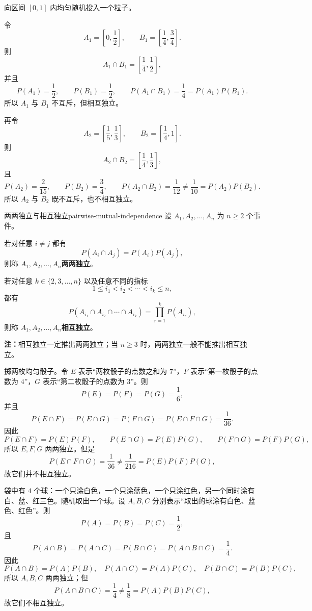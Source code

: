 \begin{example}[独立与互斥的区别]
向区间 $[0,1]$ 内均匀随机投入一个粒子。

令
\[
A_1=\left[0,\frac12\right],
\qquad
B_1=\left[\frac14,\frac34\right].
\]
则
\[
A_1\cap B_1=\left[\frac14,\frac12\right],
\]
并且
\[
P(A_1)=\frac12,
\qquad
P(B_1)=\frac12,
\qquad
P(A_1\cap B_1)=\frac14=P(A_1)P(B_1).
\]
所以 $A_1$ 与 $B_1$ 不互斥，但相互独立。

再令
\[
A_2=\left[\frac15,\frac13\right],
\qquad
B_2=\left[\frac14,1\right].
\]
则
\[
A_2\cap B_2=\left[\frac14,\frac13\right],
\]
且
\[
P(A_2)=\frac{2}{15},
\qquad
P(B_2)=\frac34,
\qquad
P(A_2\cap B_2)=\frac1{12}\ne\frac1{10}=P(A_2)P(B_2).
\]
所以 $A_2$ 与 $B_2$ 既不互斥，也不相互独立。
\end{example}
\begin{mydefinition}{两两独立与相互独立}{pairwise-mutual-independence}
	设 $A_1,A_2,\ldots,A_n$ 为 $n\geq2$ 个事件。
	
	若对任意 $i\ne j$ 都有
	\[
	P(A_i\cap A_j)=P(A_i)P(A_j),
	\]
	则称 $A_1,A_2,\ldots,A_n$\textbf{两两独立}。
	
	若对任意 $k\in\{2,3,\ldots,n\}$ 以及任意不同的指标
	\[
	1\leq i_1<i_2<\cdots<i_k\leq n,
	\]
	都有
	\[
	P(A_{i_1}\cap A_{i_2}\cap\cdots\cap A_{i_k})
	=\prod_{r=1}^{k}P(A_{i_r}),
	\]
	则称 $A_1,A_2,\ldots,A_n$\textbf{相互独立}。
\end{mydefinition}

\textbf{注：}\quad 相互独立一定推出两两独立；当 $n\geq3$ 时，两两独立一般不能推出相互独立。
\begin{example}[两两独立不推出相互独立]
掷两枚均匀骰子。令 $E$ 表示“两枚骰子的点数之和为 $7$”，$F$ 表示“第一枚骰子的点数为 $4$”，$G$ 表示“第二枚骰子的点数为 $3$”。则
\[
P(E)=P(F)=P(G)=\frac16,
\]
并且
\[
P(E\cap F)=P(E\cap G)=P(F\cap G)=P(E\cap F\cap G)=\frac1{36}.
\]
因此
\[
P(E\cap F)=P(E)P(F),
\qquad
P(E\cap G)=P(E)P(G),
\qquad
P(F\cap G)=P(F)P(G),
\]
所以 $E,F,G$ 两两独立。但是
\[
P(E\cap F\cap G)=\frac1{36}
\ne\frac1{216}=P(E)P(F)P(G),
\]
故它们并不相互独立。
\end{example}

\begin{example}[三色球模型]
袋中有 $4$ 个球：一个只涂白色，一个只涂蓝色，一个只涂红色，另一个同时涂有白、蓝、红三色。随机取出一个球。设 $A,B,C$ 分别表示“取出的球涂有白色、蓝色、红色”。则
\[
P(A)=P(B)=P(C)=\frac12,
\]
且
\[
P(A\cap B)=P(A\cap C)=P(B\cap C)=P(A\cap B\cap C)=\frac14.
\]
因此
\[
P(A\cap B)=P(A)P(B),
\quad
P(A\cap C)=P(A)P(C),
\quad
P(B\cap C)=P(B)P(C),
\]
所以 $A,B,C$ 两两独立；但
\[
P(A\cap B\cap C)=\frac14
\ne\frac18=P(A)P(B)P(C),
\]
故它们不相互独立。
\end{example}

